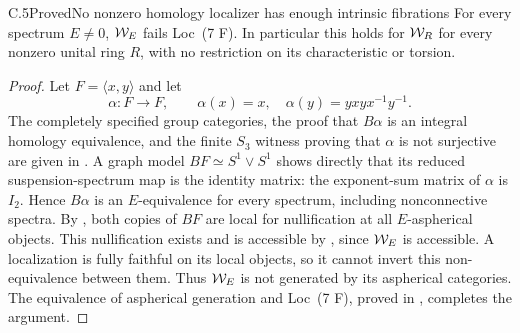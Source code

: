 \begin{claim}{C.5}{Proved}{No nonzero homology localizer has enough intrinsic fibrations}
For every spectrum $E\neq0$, $\mathcal{W}_E$ fails Loc~(7 F). In particular
this holds for $\mathcal{W}_R$ for every nonzero unital ring $R$,
with no restriction on its characteristic or torsion.
\end{claim}
\begin{proof}
Let $F=\langle x,y\rangle$ and let
\[
 \alpha:F\longrightarrow F,\qquad
 \alpha(x)=x,\quad \alpha(y)=yxyx^{-1}y^{-1}.
\]
The completely specified group categories, the proof that
$B\alpha$ is an integral homology equivalence, and the finite
$S_3$ witness proving that $\alpha$ is not surjective are given in
. A graph model $BF\simeq S^1\vee S^1$ shows directly
that its reduced suspension-spectrum map is the identity matrix:
the exponent-sum matrix of $\alpha$ is $I_2$. Hence $B\alpha$ is an
$E$-equivalence for every spectrum, including nonconnective spectra.
By , both copies of $BF$ are local for nullification
at all $E$-aspherical objects. This nullification exists and is
accessible by \citet[Proposition 6.1.8]{RootCisinski2006}, since
$\mathcal{W}_E$ is accessible. A localization is fully faithful on
its local objects, so it cannot invert this non-equivalence between
them. Thus $\mathcal{W}_E$ is not generated by its aspherical categories.
The equivalence of aspherical generation and Loc~(7 F), proved in
, completes the argument.
\end{proof}

